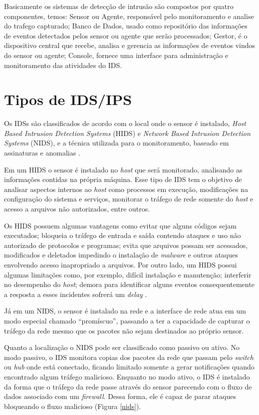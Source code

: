 \documentclass[
	12pt,				
	openright,		
	twoside,	
	a4paper,
	english,	
	brazil	
	]{abntex2}
\begin{document}
Basicamente os sistemas de detecção de intrusão são compostos por quatro componentes, temos: Sensor ou Agente, responsável pelo monitoramento e analise do trafego capturado; Banco de Dados, usado como repositório das informações de eventos detectados pelos sensor ou agente que serão processados; Gestor, é o dispositivo central que recebe, analisa e gerencia as informações de eventos vindos do sensor ou agente; Console, fornece uma interface para administração e monitoramento das atividades do IDS.

\section{Tipos de IDS/IPS}


Os IDSs são classificados de acordo com o local onde o sensor é instalado, \textit{Host Based Intrusion Detection Systems} (HIDS) e \textit{Network Based Intrusion Detection Systems} (NIDS), e a técnica utilizada para o monitoramento, baseado em assinaturas e anomalias \cite{nagahama2012ipsflow}.

Em um HIDS o sensor é instalado no \textit{host} que será monitorado, analisando as informações contidas na própria máquina. Esse tipo de IDS tem o objetivo de analisar aspectos internos ao \textit{host} como processos em execução, modificações na configuração do sistema e serviços, monitorar o tráfego de rede somente do \textit{host} e acesso a arquivos não autorizados, entre outros.

Os HIDS possuem algumas vantagens como evitar que alguns códigos sejam executados; bloqueia o tráfego de entrada e saída contendo ataques e uso não autorizado de protocolos e programas; evita que arquivos possam ser acessados, modificados e deletados impedindo o instalação de \textit{malware} e outros ataques envolvendo acesso inapropriado a arquivos. Por outro lado, um HIDS possui algumas limitações como, por exemplo, difícil instalação e manutenção; interferir no desempenho do \textit{host}; demora para identificar alguns eventos consequentemente a resposta a esses incidentes sofrerá um \textit{delay} \cite{scarfone01}.

Já em um NIDS, o sensor é instalado na rede e a interface de rede atua em um modo especial chamado ``promíscuo'', passando a ter a capacidade de capturar o tráfego da rede mesmo que os pacotes não sejam destinados ao próprio sensor.

Quanto a localização o NIDS pode ser classificado como passivo ou ativo. No modo passivo, o IDS monitora copias dos pacotes da rede que passam pelo \textit{switch} ou \textit{hub} onde está conectado, ficando limitado somente a gerar notificações quando encontrado algum tráfego malicioso. Enquanto no modo ativo, o IDS é instalado da forma que o tráfego da rede passe através do sensor parecendo com o fluxo de dados associado com um \textit{firewall}. Dessa forma, ele é capaz de parar ataques bloqueando o fluxo malicioso (Figura \ref{nids}). 
\end{document}

